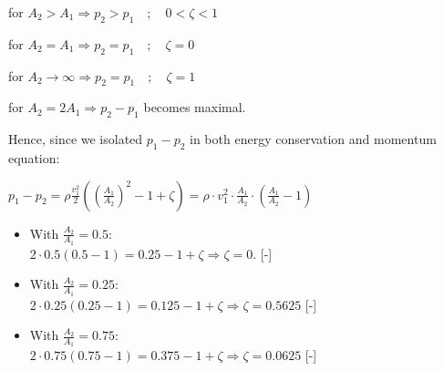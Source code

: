 \documentclass{article}
\begin{document}
for $A_2 > A_1 \Longrightarrow p_2 > p_1\quad;\quad 0<\zeta<1$

for $A_2 = A_1 \Longrightarrow p_2 = p_1\quad;\quad \zeta=0$

for $A_2 \to \infty \Longrightarrow p_2 = p_1\quad;\quad \zeta=1$

for $A_2 = 2A_1 \Longrightarrow p_2 - p_1$ becomes maximal.

Hence, since we isolated $p_1 - p_2$ in both energy conservation and momentum equation:

$p_1-p_2 = \rho\frac{v_1^2}{2}\left(\left(\frac{A_1}{A_2}\right)^2-1+\zeta\right) = \rho\cdot v_1^2\cdot \frac{A_1}{A_2}\cdot\left(\frac{A_1}{A_2}-1\right)$

\begin{itemize}
    \item With $\frac{A_2}{A_1} = 0.5$:\\[1.5ex]
        $2\cdot 0.5(0.5-1) = 0.25-1+\zeta \Rightarrow \zeta = 0.$ [-]\\[1.5ex]
    \item With $\frac{A_2}{A_1} = 0.25$:\\[1.5ex]
        $2\cdot 0.25(0.25-1) = 0.125-1+\zeta \Rightarrow \zeta = 0.5625$ [-]\\[1.5ex]
    \item With $\frac{A_2}{A_1} = 0.75$:\\[1.5ex]
        $2\cdot 0.75(0.75-1) = 0.375-1+\zeta \Rightarrow \zeta = 0.0625$ [-]\\[1.5ex]
\end{itemize}
\end{document}
